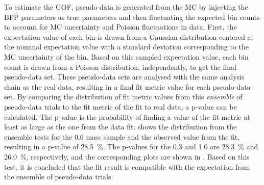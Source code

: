 To estimate the GOF, pseudo-data is generated from the MC by injecting the BFP parameters as true parameters and then fluctuating the expected bin counts to account for MC uncertainty and Poisson fluctuations in data. First, the expectation value of each bin is drawn from a Gaussian distribution centered at the nominal expectation value with a standard deviation corresponding to the MC uncertainty of the bin. Based on this sampled expectation value, each bin count is drawn from a Poisson distribution, independently, to get the final pseudo-data set. These pseudo-data sets are analysed with the same analysis chain as the real data, resulting in a final fit metric value for each pseudo-data set. By comparing the distribution of fit metric values from this \textit{ensemble} of pseudo-data trials to the fit metric of the fit to real data, a p-value can be calculated. The p-value is the probability of finding a value of the fit metric at least as large as the one from the data fit.  shows the distribution from the ensemble tests for the \SI{0.6}{\gev} mass sample and the observed value from the fit, resulting in a p-value of \SI{28.5}{\percent}. The p-values for the \SI{0.3}{\gev} and \SI{1.0}{\gev} are \SI{28.3}{\percent} and \SI{26.0}{\percent}, respectively, and the corresponding plots are shown in . Based on this test, it is concluded that the fit result is compatible with the expectation from the ensemble of pseudo-data trials.

